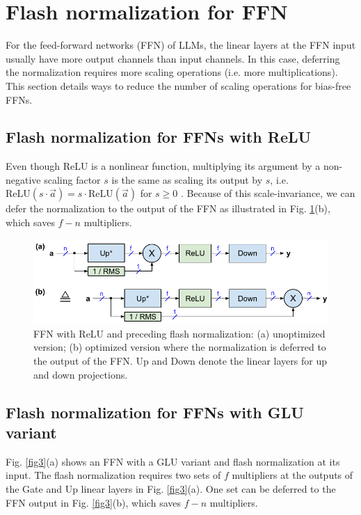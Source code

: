 \documentclass{article}
\numberwithin{equation}{section} %
\def\a{\vec{a}}                       %
\begin{document}
\section{Flash normalization for FFN}
For the feed-forward networks (FFN) of LLMs, the linear layers at the FFN input usually have more output channels than input channels. In this case, deferring the normalization requires more scaling operations (i.e. more multiplications). This section details ways to reduce the number of scaling operations for bias-free FFNs.

\subsection{Flash normalization for FFNs with ReLU}
Even though ReLU is a nonlinear function, multiplying its argument by a non-negative scaling factor $s$ is the same as scaling its output by $s$, i.e. $\text{ReLU}(s \cdot \a) = s \cdot \text{ReLU}(\a)$ for $s \ge 0$ \citep{ReLU}. Because of this scale-invariance, we can defer the normalization to the output of the FFN as illustrated in Fig. \ref{fig2}(b), which saves $f - n$ multipliers.

\begin{figure}[h!] \centering
  \includegraphics[scale=0.9]{figs/flash_fig2.pdf}
  \caption{FFN with ReLU and preceding flash normalization: (a) unoptimized version; (b) optimized version where the normalization is deferred to the output of the FFN. Up and Down denote the linear layers for up and down projections.}
\label{fig2} \end{figure}

\subsection{Flash normalization for FFNs with GLU variant}
Fig. \ref{fig3}(a) shows an FFN with a GLU variant \citep{GLU} and flash normalization at its input. The flash normalization requires two sets of $f$ multipliers at the outputs of the Gate and Up linear layers in Fig. \ref{fig3}(a). One set can be deferred to the FFN output in Fig. \ref{fig3}(b), which saves $f - n$ multipliers.
\end{document}
